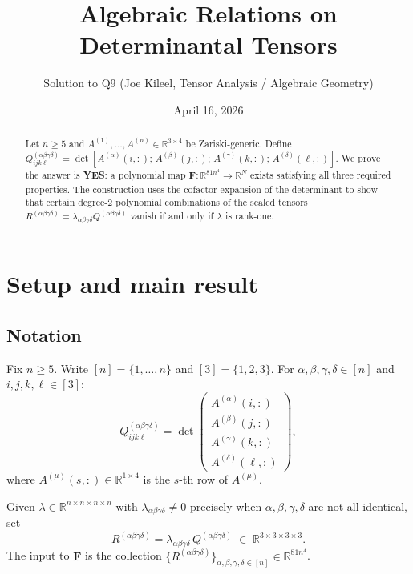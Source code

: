 \documentclass[12pt]{article}
\title{Algebraic Relations on Determinantal Tensors}
\author{Solution to Q9 (Joe Kileel, Tensor Analysis / Algebraic Geometry)}
\date{April 16, 2026}
\newcommand{\R}{\mathbb{R}}
\begin{document}
\maketitle

\begin{abstract}
Let $n \geq 5$ and $A^{(1)},\dots,A^{(n)} \in \R^{3\times 4}$ be Zariski-generic.
Define $Q^{(\alpha\beta\gamma\delta)}_{ijk\ell} = \det[A^{(\alpha)}(i,:);\,A^{(\beta)}(j,:);\,
A^{(\gamma)}(k,:);\,A^{(\delta)}(\ell,:)]$.  We prove the answer is \textbf{YES}: a polynomial
map $\mathbf{F}:\R^{81n^4}\to\R^N$ exists satisfying all three required properties.
The construction uses the cofactor expansion of the determinant to show that certain degree-$2$
polynomial combinations of the scaled tensors $R^{(\alpha\beta\gamma\delta)}=\lambda_{\alpha\beta\gamma\delta}
Q^{(\alpha\beta\gamma\delta)}$ vanish if and only if $\lambda$ is rank-one.
\end{abstract}

\tableofcontents

\section{Setup and main result}

\subsection{Notation}

Fix $n\geq 5$.  Write $[n]=\{1,\dots,n\}$ and $[3]=\{1,2,3\}$.
For $\alpha,\beta,\gamma,\delta\in[n]$ and $i,j,k,\ell\in[3]$:
\[
  Q^{(\alpha\beta\gamma\delta)}_{ijk\ell}
  = \det\!\begin{pmatrix}
      A^{(\alpha)}(i,:)\\ A^{(\beta)}(j,:)\\ A^{(\gamma)}(k,:)\\ A^{(\delta)}(\ell,:)
    \end{pmatrix},
\]
where $A^{(\mu)}(s,:)\in\R^{1\times 4}$ is the $s$-th row of $A^{(\mu)}$.

Given $\lambda\in\R^{n\times n\times n\times n}$ with $\lambda_{\alpha\beta\gamma\delta}\neq 0$
precisely when $\alpha,\beta,\gamma,\delta$ are not all identical, set
\[
  R^{(\alpha\beta\gamma\delta)} = \lambda_{\alpha\beta\gamma\delta}\,Q^{(\alpha\beta\gamma\delta)}
  \;\in\; \R^{3\times 3\times 3\times 3}.
\]
The input to $\mathbf{F}$ is the collection $\{R^{(\alpha\beta\gamma\delta)}\}_{\alpha,\beta,\gamma,\delta\in[n]}
\in\R^{81n^4}$.
\end{document}
